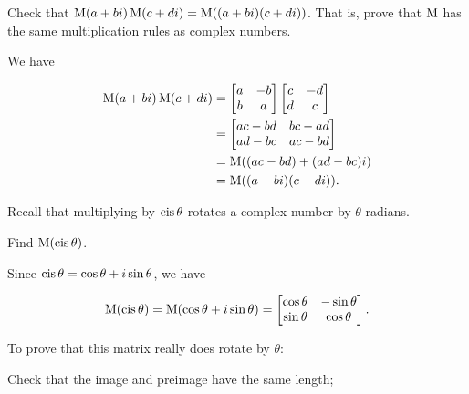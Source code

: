 \documentclass[../gatm_answers.tex]{subfiles}
\begin{document}
\begin{outer_problem}
\item Check that $\operatorname{M} (a+bi)\operatorname{M} (c+di)=\operatorname{M}((a+bi)(c+di))$. That is, prove that $\operatorname{M}$ has the same multiplication rules as complex numbers.
\end{outer_problem}

We have

\begin{align*}
\operatorname{M} (a+bi)\operatorname{M} (c+di) &= \begin{bmatrix} a & -b \\ b & a \end{bmatrix} \begin{bmatrix} c & -d \\ d & c \end{bmatrix} \\
&= \begin{bmatrix} ac-bd & bc-ad \\ ad-bc & ac-bd \end{bmatrix} \\
&= \operatorname{M}((ac-bd) + (ad-bc)i) \\
&= \operatorname{M}((a+bi)(c+di)).
\end{align*}

\begin{outer_problem}
\item Recall that multiplying by $\operatorname{cis}\theta$ rotates a complex number by $\theta$ radians.
\end{outer_problem} 

\begin{inner_problem}[start=1]
\item Find $\operatorname{M} (\operatorname{cis}\theta)$.
\end{inner_problem}

Since $\operatorname{cis}\theta = \cos\theta + i\sin\theta$, we have

$$\operatorname{M}(\operatorname{cis}\theta) = \operatorname{M}(\cos\theta + i\sin\theta) = \begin{bmatrix} \cos\theta & -\sin\theta \\ \sin\theta & \cos\theta \end{bmatrix}.$$

\begin{inner_problem}
\item To prove that this matrix really does rotate by $\theta$:
\end{inner_problem}

\begin{iinner_problem}[start=1]
\item Check that the image and preimage have the same length;
\end{iinner_problem}
\end{document}
